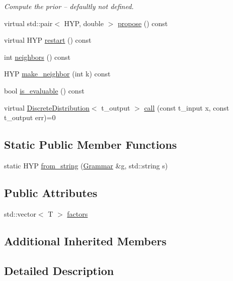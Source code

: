 \begin{DoxyCompactItemize}
\begin{DoxyCompactList}\small\item\em Compute the prior -- defaultly not defined. \end{DoxyCompactList}\item 
virtual std\+::pair$<$ H\+YP, double $>$ \hyperlink{class_lexicon_a41a1955c8d373e85c3b926f161bf7e31}{propose} () const
\item 
virtual H\+YP \hyperlink{class_lexicon_a4ffff098d0f444d3e9ec543bbd228595}{restart} () const
\item 
int \hyperlink{class_lexicon_a1bad37e75741d1f9f9cf3fb11e9410d1}{neighbors} () const
\item 
H\+YP \hyperlink{class_lexicon_a2a5b2b625f4c7477c049c1fd8f0a2e3e}{make\+\_\+neighbor} (int k) const
\item 
bool \hyperlink{class_lexicon_ad48a8d79b77aed51caff4d10c7de43a1}{is\+\_\+evaluable} () const
\item 
virtual \hyperlink{class_discrete_distribution}{Discrete\+Distribution}$<$ t\+\_\+output $>$ \hyperlink{class_lexicon_aaaff682145f9cb15f7252420fe76f111}{call} (const t\+\_\+input x, const t\+\_\+output err)=0
\end{DoxyCompactItemize}
\subsection*{Static Public Member Functions}
\begin{DoxyCompactItemize}
\item 
static H\+YP \hyperlink{class_lexicon_a1a78d0be4350165b5757201b411f94f8}{from\+\_\+string} (\hyperlink{class_grammar}{Grammar} \&g, std\+::string s)
\end{DoxyCompactItemize}
\subsection*{Public Attributes}
\begin{DoxyCompactItemize}
\item 
std\+::vector$<$ T $>$ \hyperlink{class_lexicon_a030dd03b0f892b4bda7f8bc6ff3fc7df}{factors}
\end{DoxyCompactItemize}
\subsection*{Additional Inherited Members}


\subsection{Detailed Description}

